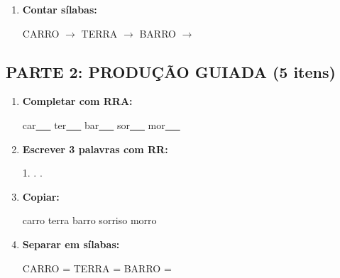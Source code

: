\begin{exercicio}
\begin{enumerate}
  \item \textbf{Contar sílabas:}
  \begin{center}
  CARRO $\rightarrow$ \underline{\hspace{0.9cm}} \quad TERRA $\rightarrow$ \underline{\hspace{0.9cm}} \quad BARRO $\rightarrow$ \underline{\hspace{0.9cm}}
  \end{center}

\end{enumerate}

\subsection*{PARTE 2: PRODUÇÃO GUIADA (5 itens)}

\begin{enumerate}[resume]

  \item \textbf{Completar com RRA:}
  \begin{center}
  car\underline{~~~} \quad ter\underline{~~~} \quad bar\underline{~~~} \quad sor\underline{~~~} \quad mor\underline{~~~}
  \end{center}

  \item \textbf{Escrever 3 palavras com RR:}
  \begin{center}
  1. \underline{\hspace{3cm}} . \underline{\hspace{3cm}} . \underline{\hspace{3cm}}
  \end{center}

  \item \textbf{Copiar:}
  \begin{center}
  carro \quad terra \quad barro \quad sorriso \quad morro
  \end{center}

  \item \textbf{Separar em sílabas:}
  \begin{center}
  CARRO = \underline{\hspace{1cm}} \underline{\hspace{1cm}} \quad TERRA = \underline{\hspace{1cm}} \underline{\hspace{1cm}} \quad BARRO = \underline{\hspace{1cm}} \underline{\hspace{1cm}}
  \end{center}


\end{enumerate}
\end{exercicio}

